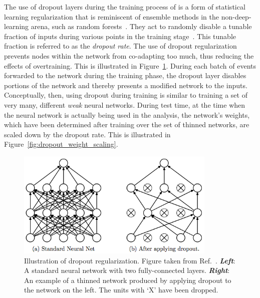 The use of dropout layers during the training process of is a form of statistical learning regularization that is reminiscent
of ensemble methods in the non-deep-learning arena, such as random forests~\cite{RandomForestsBreiman2001}.
They act to randomly disable a tunable fraction of inputs during various points in the training stage~\cite{JMLRDropout}.
This tunable fraction is referred to as the \textit{dropout rate}.
The use of dropout regularization prevents nodes within the network from co-adapting too much, thus reducing
the effects of overtraining.
This is illustrated in Figure~\ref{fig:dropout_illustration}.
During each batch of events forwarded to the network during the training phase, the dropout layer disables
portions of the network and thereby presents a modified network to the inputs.
Conceptually, then, using dropout during training is similar to training a set of very many, different \textit{weak}
neural networks.
During test time, at the time when the neural network is actually being used in the analysis,
the network's weights, which have been determined after training over the set of thinned networks,
are scaled down by the dropout rate.
This is illustrated in Figure~\ref{fig:dropout_weight_scaling}.

\begin{figure}[!htb]
    \begin{center}
        \includegraphics[width=0.85\textwidth]{figures/search_hh/mva/dropout_illustration}
        \caption{
            Illustration of dropout regularization. Figure taken from Ref.~\cite{JMLRDropout}.
            \textit{\textbf{Left}}: A standard neural network with two fully-connected layers.
            \textit{\textbf{Right}}: An example of a thinned network produced by applying dropout to the
                network on the left.
                The units with `X' have been dropped.
        }
        \label{fig:dropout_illustration}
    \end{center}
\end{figure}

